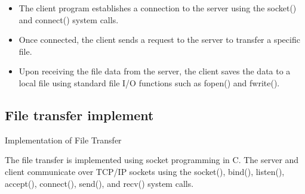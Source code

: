 \documentclass{article}
\begin{document}
\begin{itemize}
\item The client program establishes a connection to the server using the socket() and connect() system calls.
\item Once connected, the client sends a request to the server to transfer a specific file.
\item Upon receiving the file data from the server, the client saves the data to a local file using standard file I/O functions such as fopen() and fwrite().
\end{itemize}

\subsection{File transfer implement }

Implementation of File Transfer

The file transfer is implemented using socket programming in C. The server and client communicate over TCP/IP sockets using the socket(), bind(), listen(), accept(), connect(), send(), and recv() system calls.
\end{document}
